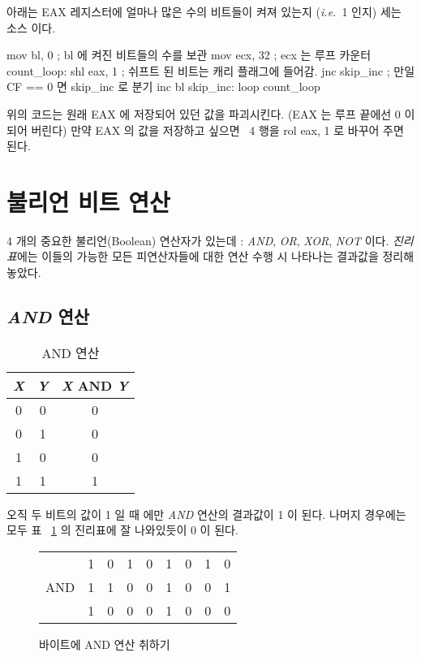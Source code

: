 아래는 EAX 레지스터에 얼마나 많은 수의 비트들이 켜져 있는지 (\emph{i.e.}~1 인지)
세는 소스 이다. 
\begin{AsmCodeListing}
      mov    bl, 0           ; bl 에 켜진 비트들의 수를 보관
      mov    ecx, 32         ; ecx 는 루프 카운터
count_loop:
      shl    eax, 1          ; 쉬프트 된 비트는 캐리 플래그에 들어감. 
      jnc    skip_inc        ; 만일 CF == 0 면 skip_inc 로 분기
      inc    bl
skip_inc:
      loop   count_loop
\end{AsmCodeListing}
위의 코드는 원래 {\code EAX} 에 저장되어 있던 값을 파괴시킨다. ({\code EAX} 는 
루프 끝에선 0 이 되어 버린다) 만약 {\code EAX} 의 값을 저장하고 싶으면 ~4 행을
{\code rol eax, 1} 로 바꾸어 주면 된다. 


\section{불리언 비트 연산}

4 개의 중요한 불리언(Boolean) 연산자가 있는데 : \emph{AND}, \emph{OR}, \emph{XOR}, 
\emph{NOT} 이다. \emph{진리표}에는 이들의 가능한 모든 피연산자들에 대한 연산 
수행 시 나타나는 결과값을 정리해놓았다. 

\subsection{\emph{AND} 연산 }

\begin{table}[t]
\centering
\begin{tabular}{|c|c|c|}
\hline
\emph{X} & \emph{Y} & \emph{X} AND \emph{Y} \\
\hline \hline
0 & 0 & 0 \\
0 & 1 & 0 \\
1 & 0 & 0 \\
1 & 1 & 1 \\
\hline
\end{tabular}
\caption{AND 연산 \label{tab:and} }
\end{table}

오직 두 비트의 값이 1 일 때 에만 \emph{AND} 연산의 결과값이 1 이 된다. 나머지 경우에는
모두 표 ~\ref{tab:and} 의 진리표에 잘 나와있듯이 0 이 된다. 

\begin{figure}[t]
\centering
\begin{tabular}{rcccccccc}
    & 1 & 0 & 1 & 0 & 1 & 0 & 1 & 0 \\
AND & 1 & 1 & 0 & 0 & 1 & 0 & 0 & 1 \\
\hline
    & 1 & 0 & 0 & 0 & 1 & 0 & 0 & 0
\end{tabular}
\caption{바이트에 AND 연산 취하기 \label{fig:and}}
\end{figure}

